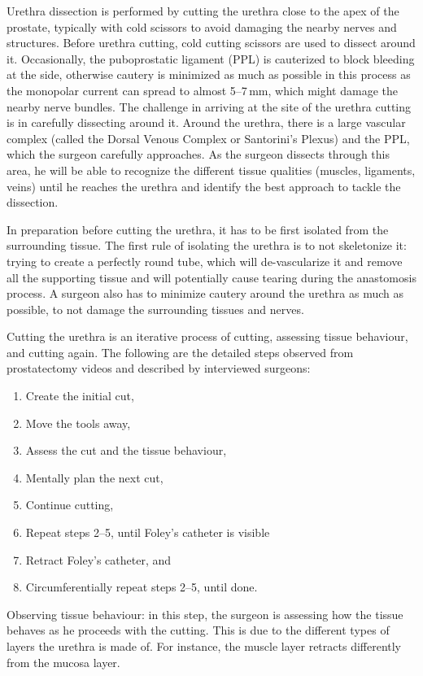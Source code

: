 Urethra dissection is performed by cutting the urethra close to the apex of the prostate, typically with cold scissors to avoid damaging the nearby nerves and structures. Before urethra cutting, cold cutting scissors are used to dissect around it. Occasionally, the puboprostatic ligament (PPL) is cauterized to block bleeding at the side, otherwise cautery is minimized as much as possible in this process as the monopolar current can spread to almost 5--7\,mm, which might damage the nearby nerve bundles. The challenge in arriving at the site of the urethra cutting is in carefully dissecting around it. Around the urethra, there is a large vascular complex (called the Dorsal Venous Complex or Santorini's Plexus) and the PPL, which the surgeon carefully approaches. As the surgeon dissects through this area, he will be able to recognize the different tissue qualities (muscles, ligaments, veins) until he reaches the urethra and identify the best approach to tackle the dissection.

In preparation before cutting the urethra, it has to be first isolated from the surrounding tissue. The first rule of isolating the urethra is to not skeletonize it: trying to create a perfectly round tube, which will de-vascularize it and remove all the supporting tissue and will potentially cause tearing during the anastomosis process. A surgeon also has to minimize cautery around the urethra as much as possible, to not damage the surrounding tissues and nerves.

Cutting the urethra is an iterative process of cutting, assessing tissue behaviour, and cutting again. The following are the detailed steps observed from prostatectomy videos and described by interviewed surgeons:
\begin{enumerate}[1.][8]
  \item Create the initial cut,
  \item Move the tools away,
  \item Assess the cut and the tissue behaviour,
  \item Mentally plan the next cut,
  \item Continue cutting,
  \item Repeat steps 2--5, until Foley's catheter is visible
  \item Retract Foley's catheter, and
  \item Circumferentially repeat steps 2--5, until done.
\end{enumerate}

Observing tissue behaviour: in this step, the surgeon is assessing how the tissue behaves as he proceeds with the cutting. This is due to the different types of layers the urethra is made of. For instance, the muscle layer retracts differently from the mucosa layer.

